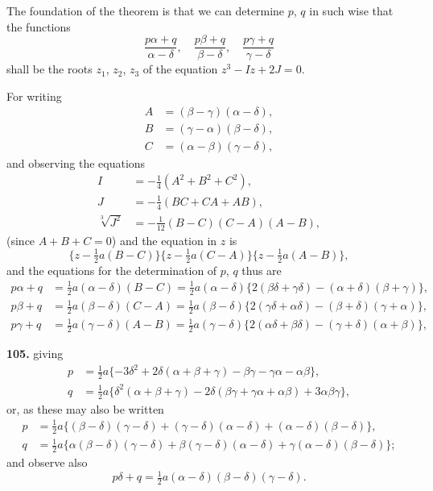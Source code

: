 \documentclass[11pt,a4paper]{book}
\begin{document}
The foundation of the theorem is that we can determine $p$, $q$ in such wise that the functions
\[
\frac{p\alpha + q}{\alpha - \delta}, \quad \frac{p\beta + q}{\beta - \delta}, \quad \frac{p\gamma + q}{\gamma - \delta}
\]
shall be the roots $z_1$, $z_2$, $z_3$ of the equation $z^3 - Iz + 2J = 0$.

For writing
\begin{align*}
A &= (\beta - \gamma)(\alpha - \delta), \\
B &= (\gamma - \alpha)(\beta - \delta), \\
C &= (\alpha - \beta)(\gamma - \delta),
\end{align*}
and observing the equations
\begin{align*}
I &= -\tfrac{1}{4}(A^2 + B^2 + C^2), \\
J &= -\tfrac{1}{4}(BC + CA + AB), \\
\sqrt[3]{J^2} &= -\tfrac{1}{12}(B - C)(C - A)(A - B),
\end{align*}
(since $A + B + C = 0$) and the equation in $z$ is
\[
\{z - \tfrac{1}{2}a(B - C)\}\{z - \tfrac{1}{2}a(C - A)\}\{z - \tfrac{1}{2}a(A - B)\},
\]
and the equations for the determination of $p$, $q$ thus are
\begin{align*}
p\alpha + q &= \tfrac{1}{2}a(\alpha - \delta)(B - C) = \tfrac{1}{2}a(\alpha - \delta)\{2(\beta\delta + \gamma\delta) - (\alpha + \delta)(\beta + \gamma)\}, \\
p\beta + q &= \tfrac{1}{2}a(\beta - \delta)(C - A) = \tfrac{1}{2}a(\beta - \delta)\{2(\gamma\delta + \alpha\delta) - (\beta + \delta)(\gamma + \alpha)\}, \\
p\gamma + q &= \tfrac{1}{2}a(\gamma - \delta)(A - B) = \tfrac{1}{2}a(\gamma - \delta)\{2(\alpha\delta + \beta\delta) - (\gamma + \delta)(\alpha + \beta)\},
\end{align*}

\noindent\textbf{105.} giving
\begin{align*}
p &= \tfrac{1}{2}a\{-3\delta^2 + 2\delta(\alpha + \beta + \gamma) - \beta\gamma - \gamma\alpha - \alpha\beta\}, \\
q &= \tfrac{1}{2}a\{\delta^2(\alpha + \beta + \gamma) - 2\delta(\beta\gamma + \gamma\alpha + \alpha\beta) + 3\alpha\beta\gamma\},
\end{align*}
or, as these may also be written
\begin{align*}
p &= \tfrac{1}{2}a\{(\beta - \delta)(\gamma - \delta) + (\gamma - \delta)(\alpha - \delta) + (\alpha - \delta)(\beta - \delta)\}, \\
q &= \tfrac{1}{2}a\{\alpha(\beta - \delta)(\gamma - \delta) + \beta(\gamma - \delta)(\alpha - \delta) + \gamma(\alpha - \delta)(\beta - \delta)\};
\end{align*}
and observe also
\[
p\delta + q = \tfrac{1}{2}a(\alpha - \delta)(\beta - \delta)(\gamma - \delta).
\]
\end{document}
